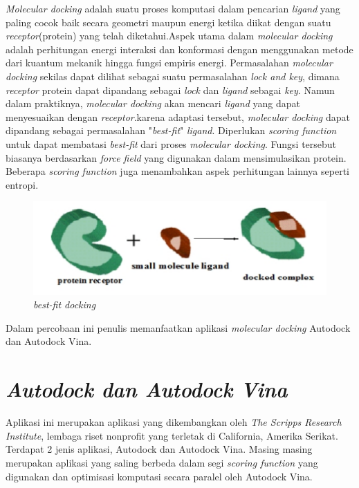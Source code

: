 \textit{Molecular docking} adalah suatu proses komputasi dalam pencarian \textit{ligand} yang paling cocok baik secara geometri maupun energi ketika diikat dengan suatu \textit{receptor}(protein) yang telah diketahui.Aspek utama dalam \textit{molecular docking} adalah perhitungan energi interaksi dan konformasi dengan menggunakan metode dari kuantum mekanik hingga fungsi empiris energi. Permasalahan \textit{molecular docking} sekilas dapat dilihat sebagai suatu permasalahan \textit{lock and key}, dimana \textit{receptor} protein dapat dipandang sebagai \textit{lock} dan \textit{ligand} sebagai \textit{key}. Namun dalam praktiknya, \textit{molecular docking} akan mencari \textit{ligand} yang dapat menyesuaikan dengan \textit{receptor}.karena adaptasi tersebut, \textit{molecular docking} dapat dipandang sebagai permasalahan "\textit{best-fit}" \textit{ligand}. Diperlukan \textit{scoring function} untuk dapat membatasi \textit{best-fit} dari proses \textit{molecular docking}. Fungsi tersebut biasanya berdasarkan \textit{force field} yang digunakan dalam mensimulasikan protein. Beberapa \textit{scoring function} juga menambahkan aspek perhitungan lainnya seperti entropi.
\begin{figure}
	\centering
	\includegraphics{molecular_docking.png}
	\caption{\textit{best-fit docking}}
\end{figure}
Dalam percobaan ini penulis memanfaatkan aplikasi \textit{molecular docking} Autodock dan Autodock Vina.

\section{\textit{Autodock dan Autodock Vina}}
\hspace{0.5cm}Aplikasi ini merupakan aplikasi yang dikembangkan oleh \textit{The Scripps Research Institute}, lembaga riset nonprofit yang terletak di California, Amerika Serikat. Terdapat 2 jenis aplikasi, Autodock dan Autodock Vina. Masing masing merupakan aplikasi yang saling berbeda dalam segi \textit{scoring function} yang digunakan dan optimisasi komputasi secara paralel oleh Autodock Vina. 


